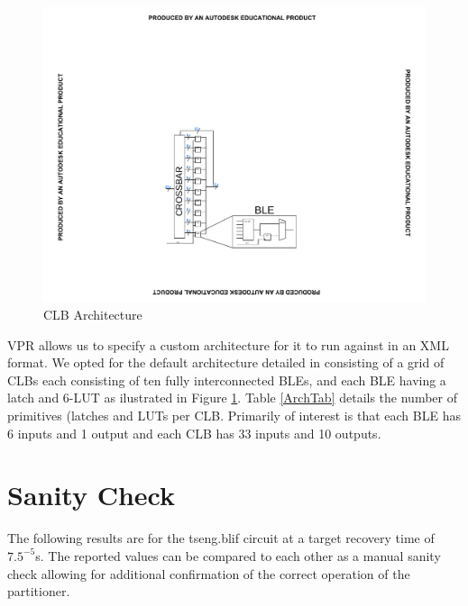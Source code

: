 \documentclass[12pt,final,oneside]{dwThesis} %
\begin{document}
   \begin{figure}

      \begin{center}

         \includegraphics[clip,trim=8cm 4cm 8cm 8cm]{images/CLB.pdf}
         \caption{\gls{CLB} Architecture} \label{ArchFig} 
      \end{center}


   \end{figure}
   \gls{VPR} allows us to specify a custom architecture for it to
   run against in an XML format. We opted for the default architecture detailed
   in \cite{VPRManual} consisting of a grid of \glspl{CLB} each consisting of
   ten fully interconnected \glspl{BLE}, and each \gls{BLE} having a latch and
   6-\gls{LUT} as ilustrated in Figure \ref{ArchFig}.  Table \ref{ArchTab}
   details the number of primitives (latches and \glspl{LUT} per \gls{CLB}.
   Primarily of interest is that each \gls{BLE} has 6 inputs and 1 output and
   each \gls{CLB} has 33 inputs and 10 outputs.  





   \section{Sanity Check}
   \label{resSanity} The following results are for the
   tseng.blif circuit at a target recovery time of $7.5^{-5}$s. The reported
   values can be compared to each other as a manual sanity check allowing for
   additional confirmation of the correct operation of the partitioner.
\end{document}
